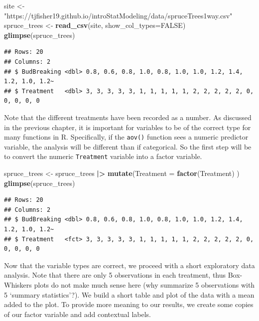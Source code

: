 \documentclass[
]{book}
\newenvironment{Shaded}{\begin{snugshade}}{\end{snugshade}}
\newcommand{\AttributeTok}[1]{\textcolor[rgb]{0.13,0.29,0.53}{#1}}
\newcommand{\ConstantTok}[1]{\textcolor[rgb]{0.56,0.35,0.01}{#1}}
\newcommand{\FunctionTok}[1]{\textcolor[rgb]{0.13,0.29,0.53}{\textbf{#1}}}
\newcommand{\NormalTok}[1]{#1}
\newcommand{\OtherTok}[1]{\textcolor[rgb]{0.56,0.35,0.01}{#1}}
\newcommand{\SpecialCharTok}[1]{\textcolor[rgb]{0.81,0.36,0.00}{\textbf{#1}}}
\newcommand{\StringTok}[1]{\textcolor[rgb]{0.31,0.60,0.02}{#1}}
\begin{document}
\begin{Shaded}
\begin{Highlighting}[]
\NormalTok{site }\OtherTok{\textless{}{-}} \StringTok{"https://tjfisher19.github.io/introStatModeling/data/spruceTrees1way.csv"}
\NormalTok{spruce\_trees }\OtherTok{\textless{}{-}} \FunctionTok{read\_csv}\NormalTok{(site, }\AttributeTok{show\_col\_types=}\ConstantTok{FALSE}\NormalTok{)}
\FunctionTok{glimpse}\NormalTok{(spruce\_trees)}
\end{Highlighting}
\end{Shaded}

\begin{verbatim}
## Rows: 20
## Columns: 2
## $ BudBreaking <dbl> 0.8, 0.6, 0.8, 1.0, 0.8, 1.0, 1.0, 1.2, 1.4, 1.2, 1.0, 1.2~
## $ Treatment   <dbl> 3, 3, 3, 3, 3, 1, 1, 1, 1, 1, 2, 2, 2, 2, 2, 0, 0, 0, 0, 0
\end{verbatim}

Note that the different treatments have been recorded as a number.
As discussed in the previous chapter, it is important for variables to be of the correct type for many functions in R.
Specifically, if the \texttt{aov()} function sees a numeric predictor variable, the analysis will be different than if categorical.
So the first step will be to convert the numeric \texttt{Treatment} variable into a factor variable.

\begin{Shaded}
\begin{Highlighting}[]
\NormalTok{spruce\_trees }\OtherTok{\textless{}{-}}\NormalTok{ spruce\_trees }\SpecialCharTok{|\textgreater{}}
  \FunctionTok{mutate}\NormalTok{(}\AttributeTok{Treatment =} \FunctionTok{factor}\NormalTok{(Treatment) )}
\FunctionTok{glimpse}\NormalTok{(spruce\_trees)}
\end{Highlighting}
\end{Shaded}

\begin{verbatim}
## Rows: 20
## Columns: 2
## $ BudBreaking <dbl> 0.8, 0.6, 0.8, 1.0, 0.8, 1.0, 1.0, 1.2, 1.4, 1.2, 1.0, 1.2~
## $ Treatment   <fct> 3, 3, 3, 3, 3, 1, 1, 1, 1, 1, 2, 2, 2, 2, 2, 0, 0, 0, 0, 0
\end{verbatim}

Now that the variable types are correct, we proceed with a short exploratory data analysis.
Note that there are only 5 observations in each treatment, thus Box-Whiskers plots do not make much sense here (why summarize 5 observations with 5 `summary statistics'?).
We build a short table and plot of the data with a mean added to the plot.
To provide more meaning to our results, we create some copies of our factor variable and add contextual labels.
\end{document}
